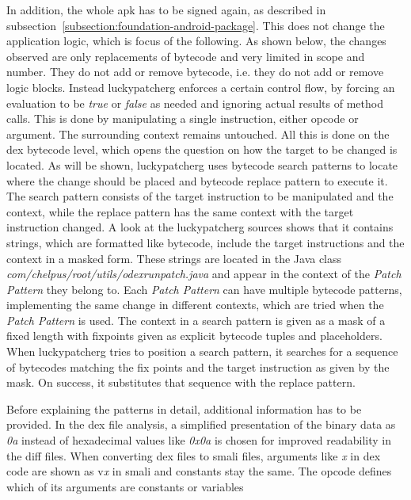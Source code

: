 In addition, the whole \gls{apk} has to be signed again, as described in subsection~\ref{subsection:foundation-android-package}.
This does not change the application logic, which is focus of the following.
\newline
\newline
As shown below, the changes observed are only replacements of bytecode and very limited in scope and number.
They do not add or remove bytecode, i.e. they do not add or remove logic blocks.
Instead \gls{luckypatcherg} enforces a certain control flow, by forcing an evaluation to be \textit{true} or \textit{false} as needed and ignoring actual results of method calls.
This is done by manipulating a single instruction, either opcode or argument.
The surrounding context remains untouched.
\newline
All this is done on the dex bytecode level, which opens the question on how the target to be changed is located.
As will be shown, \gls{luckypatcherg} uses bytecode search patterns to locate where the change should be placed and bytecode replace pattern to execute it.
\newline
The search pattern consists of the target instruction to be manipulated and the context, while the replace pattern has the same context with the target instruction changed.
A look at the \gls{luckypatcherg} sources shows that it contains strings, which are formatted like bytecode, include the target instructions and the context in a masked form.
These strings are located in the Java class \textit{com/chelpus/root/utils/odexrunpatch.java} and appear in the context of the \textit{Patch Pattern} they belong to.
Each \textit{Patch Pattern} can have multiple bytecode patterns, implementing the same change in different contexts, which are tried when the \textit{Patch Pattern} is used.
\newline
The context in a search pattern is given as a mask of a fixed length with fixpoints given as explicit bytecode tuples and placeholders.
When \gls{luckypatcherg} tries to position a search pattern, it searches for a sequence of bytecodes matching the fix points and the target instruction as given by the mask.
On success, it substitutes that sequence with the replace pattern.
\newline
\newline

Before explaining the patterns in detail, additional information has to be provided.
In the \gls{dex} file analysis, a simplified presentation of the binary data as \textit{0a} instead of hexadecimal values like \textit{0x0a} is chosen for improved readability in the diff files.
When converting \gls{dex} files to smali files, arguments like \textit{x} in dex code are shown as  v\textit{x} in smali and constants stay the same.
The opcode defines which of its arguments are constants or variables
